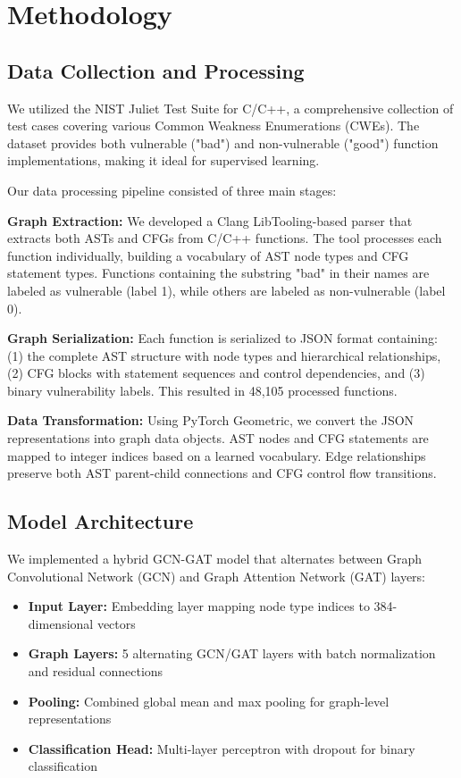\section{Methodology}

\subsection{Data Collection and Processing}

We utilized the NIST Juliet Test Suite for C/C++, a comprehensive collection of test cases covering various Common Weakness Enumerations (CWEs). The dataset provides both vulnerable ("bad") and non-vulnerable ("good") function implementations, making it ideal for supervised learning.

Our data processing pipeline consisted of three main stages:

\textbf{Graph Extraction:} We developed a Clang LibTooling-based parser that extracts both ASTs and CFGs from C/C++ functions. The tool processes each function individually, building a vocabulary of AST node types and CFG statement types. Functions containing the substring "bad" in their names are labeled as vulnerable (label 1), while others are labeled as non-vulnerable (label 0).

\textbf{Graph Serialization:} Each function is serialized to JSON format containing: (1) the complete AST structure with node types and hierarchical relationships, (2) CFG blocks with statement sequences and control dependencies, and (3) binary vulnerability labels. This resulted in 48,105 processed functions.

\textbf{Data Transformation:} Using PyTorch Geometric, we convert the JSON representations into graph data objects. AST nodes and CFG statements are mapped to integer indices based on a learned vocabulary. Edge relationships preserve both AST parent-child connections and CFG control flow transitions.

\subsection{Model Architecture}

We implemented a hybrid GCN-GAT model that alternates between Graph Convolutional Network (GCN) and Graph Attention Network (GAT) layers:

\begin{itemize}
\item \textbf{Input Layer:} Embedding layer mapping node type indices to 384-dimensional vectors
\item \textbf{Graph Layers:} 5 alternating GCN/GAT layers with batch normalization and residual connections
\item \textbf{Pooling:} Combined global mean and max pooling for graph-level representations  
\item \textbf{Classification Head:} Multi-layer perceptron with dropout for binary classification
\end{itemize}

